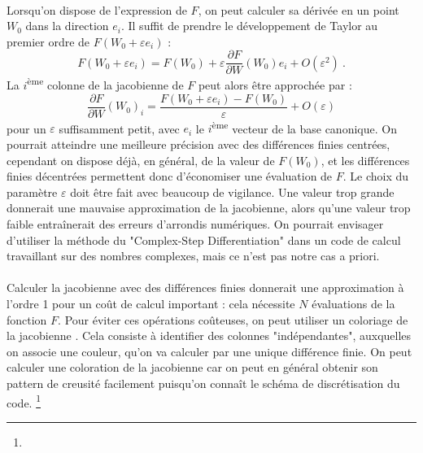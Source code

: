       \paragraph{}
      Lorsqu'on dispose de l'expression de $F$, on peut calculer sa dérivée en un point $W_0$ dans la direction $e_i$.
      Il suffit de prendre le développement de Taylor au premier ordre de $F\left(W_0 + \varepsilon e_i\right)$ :
      \[F\left(W_0 + \varepsilon e_i\right) = F\left(W_0\right) + \varepsilon\frac{\partial F}{\partial W}\left(W_0\right)e_i + O\left(\varepsilon^2\right)\ .\]
      La $i$\textsuperscript{ème} colonne de la jacobienne de $F$ peut alors être approchée par :
      \[\frac{\partial F}{\partial W}\left(W_0\right)_i = \frac{F\left(W_0 + \varepsilon e_i\right) - F\left(W_0\right)}{\varepsilon} + O\left(\varepsilon\right)\]
      pour un $\varepsilon$ suffisamment petit, avec $e_i$ le $i$\textsuperscript{ème} vecteur de la base canonique.
      On pourrait atteindre une meilleure précision avec des différences finies centrées, cependant on dispose déjà, en général, de la valeur de $F\left(W_0\right)$, et les différences finies décentrées permettent donc d'économiser une évaluation de $F$.
      Le choix du paramètre $\varepsilon$ doit être fait avec beaucoup de vigilance.
      Une valeur trop grande donnerait une mauvaise approximation de la jacobienne, alors qu'une valeur trop faible entraînerait des erreurs d'arrondis numériques.
      On pourrait envisager d'utiliser la méthode du "Complex-Step Differentiation" dans un code de calcul travaillant sur des nombres complexes, mais ce n'est pas notre cas a priori.

      \paragraph{}
      Calculer la jacobienne avec des différences finies donnerait une approximation à l'ordre 1 pour un coût de calcul important : cela nécessite $N$ évaluations de la fonction $F$.
      Pour éviter ces opérations coûteuses, on peut utiliser un coloriage de la jacobienne \cite{GebremedhinMannePothen2005}.
      Cela consiste à identifier des colonnes "indépendantes", auxquelles on associe une couleur, qu'on va calculer par une unique différence finie.
      On peut calculer une coloration de la jacobienne car on peut en général obtenir son pattern de creusité facilement puisqu'on connaît le schéma de discrétisation du code.
      \footnote{}

